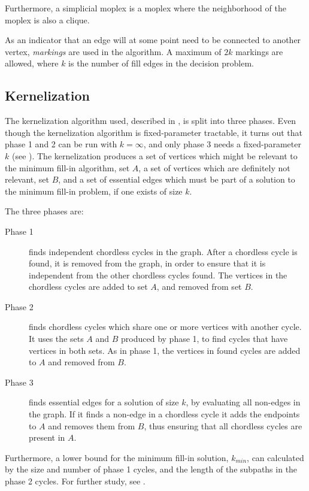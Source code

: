 \documentclass{article}
\begin{document}
	Furthermore, a simplicial moplex is a moplex where the neighborhood of the moplex is also a clique.

	As an indicator that an edge will at some point need to be connected to another vertex, \emph{markings} are used in the algorithm. 
	A maximum of $2k$ markings are allowed, where $k$ is the number of fill edges in the decision problem.

		\subsection{Kernelization}
		The kernelization algorithm used, described in \cite{kernel}, is split into three phases. 
		Even though the kernelization algorithm is fixed-parameter tractable, it turns out that phase 1 and 2 can be run with $k=\infty$, and only phase 3 needs a fixed-parameter $k$ (see \cite{polynomial-approx}). 
		The kernelization produces a set of vertices which might be relevant to the minimum fill-in algorithm, set $A$, a set of vertices which are definitely not relevant, set $B$, and a set of essential edges which must be part of a solution to the minimum fill-in problem, if one exists of size $k$. 

		The three phases are:
		\begin{description}
			\item[Phase 1] finds independent chordless cycles in the graph. After a chordless cycle is found, it is removed from the graph, in order to ensure that it is independent from the other chordless cycles found. The vertices in the chordless cycles are added to set $A$, and removed from set $B$.
			\item[Phase 2] finds chordless cycles which share one or more vertices with another cycle. It uses the sets $A$ and $B$ produced by phase 1, to find cycles that have vertices in both sets. As in phase 1, the vertices in found cycles are added to $A$ and removed from $B$.
			\item[Phase 3] finds essential edges for a solution of size $k$, by evaluating all non-edges in the graph. If it finds a non-edge in a chordless cycle it adds the endpoints to $A$ and removes them from $B$, thus ensuring that all chordless cycles are present in $A$.
		\end{description}

		Furthermore, a lower bound for the minimum fill-in solution, $k_{min}$, can calculated by the size and number of phase 1 cycles, and the length of the subpaths in the phase 2 cycles. 
		For further study, see \cite{kernel, polynomial-approx}.
\end{document}
